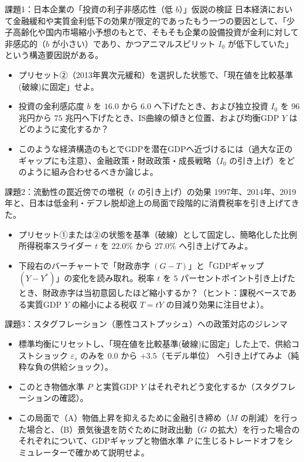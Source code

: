 \documentclass[lualatex,a4paper,11pt,ja=standard]{bxjsarticle}
\begin{document}
\begin{questionbox}{課題1：日本企業の「投資の利子非感応性（低 $b$）」仮説の検証}
日本経済において金融緩和や実質金利低下の効果が限定的であったもう一つの要因として、「少子高齢化や国内市場縮小予想のもとで、そもそも企業の設備投資が金利に対して非感応的（$b$ が小さい）であり、かつアニマルスピリット $I_0$ が低下していた」という構造要因説がある。
\begin{itemize}[leftmargin=5mm,noitemsep]
  \item プリセット②（2013年異次元緩和）を選択した状態で、「現在値を比較基準(破線)に固定」せよ。
  \item 投資の金利感応度 $b$ を $16.0$ から $6.0$ へ下げたとき、および独立投資 $I_0$ を $96$ 兆円から $75$ 兆円へ下げたとき、IS曲線の傾きと位置、および均衡GDP $Y$ はどのように変化するか？
  \item このような経済構造のもとでGDPを潜在GDPへ近づけるには（過大な正のギャップにも注意）、金融政策・財政政策・成長戦略（$I_0$ の引き上げ）をどのように組み合わせるべきか論じよ。
\end{itemize}
\end{questionbox}

\begin{questionbox}{課題2：流動性の罠近傍での増税（$t$ の引き上げ）の効果}
1997年、2014年、2019年と、日本は低金利・デフレ脱却途上の局面で段階的に消費税率を引き上げてきた。
\begin{itemize}[leftmargin=5mm,noitemsep]
  \item プリセット①または②の状態を基準（破線）として固定し、簡略化した比例所得税率スライダー $t$ を $22.0\%$ から $27.0\%$ へ引き上げてみよ。
  \item 下段右のバーチャートで「財政赤字 $(G - T)$」と「GDPギャップ $(Y - Y^*)$」の変化を読み取れ。税率 $t$ を $5$ パーセントポイント引き上げたとき、財政赤字は当初意図したほど縮小するか？（ヒント：課税ベースである実質GDP $Y$ の縮小による税収 $T = tY$ の目減り効果に注目せよ）。
\end{itemize}
\end{questionbox}

\begin{questionbox}{課題3：スタグフレーション（悪性コストプッシュ）への政策対応のジレンマ}
\begin{itemize}[leftmargin=5mm,noitemsep]
  \item 標準均衡にリセットし、「現在値を比較基準(破線)に固定」した上で、供給コストショック $\varepsilon_s$ のみを $0.0$ から $+3.5$（モデル単位） へ引き上げてみよ（純粋な負の供給ショック）。
  \item このとき物価水準 $P$ と実質GDP $Y$ はそれぞれどう変化するか（スタグフレーションの確認）。
  \item この局面で（A）物価上昇を抑えるために金融引き締め（$M$ の削減）を行った場合と、（B）景気後退を防ぐために財政出動（$G$ の拡大）を行った場合のそれぞれについて、GDPギャップと物価水準 $P$ に生じるトレードオフをシミュレーターで確かめて説明せよ。
\end{itemize}
\end{questionbox}
\end{document}
